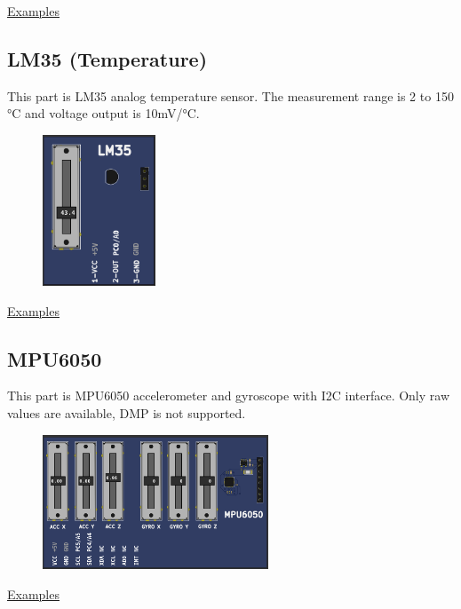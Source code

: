 \href{https://lcgamboa.github.io/picsimlab_examples/Parts.html\#Keypad}{Examples}

\subsection{LM35 (Temperature)}

This part is LM35 analog temperature sensor. The measurement range is 2 to 150 °C  and 
voltage output is 10mV/°C.

\begin{figure}[H]
\center
\includegraphics[width=0.3\textwidth]{img/part_lm35.png} 
\end{figure} 


\href{https://lcgamboa.github.io/picsimlab_examples/Parts.html\#LM35_(Temperature)}{Examples}


\subsection{MPU6050}

This part is MPU6050 accelerometer and gyroscope with I2C interface. 
Only raw values are available, DMP is not supported.

\begin{figure}[H]
\center
\includegraphics[width=0.6\textwidth]{img/part_mpu6050.png} 
\end{figure} 


\href{https://lcgamboa.github.io/picsimlab_examples/Parts.html\#MPU6050}{Examples}


